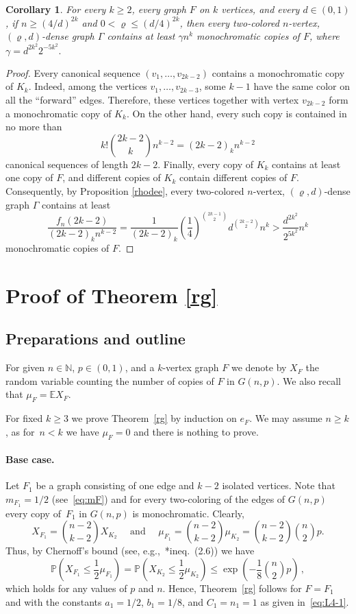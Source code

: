 \documentclass[reqno, 12pt]{amsart}
\newcommand{\PP}{\mathds{P}}
\newtheorem{cor}[theorem]{Corollary}
\let\rho=\varrho
\def\NN{\mathds N}
\def\PP{\mathds P}
\def\EE{\mathds E}
\begin{document}
\begin{cor}\label{mon}
 For every $k\ge2$, every graph $F$ on $k$ vertices, and every $d\in(0,1)$, if $n\ge (4/d)^{2k}$
 and $0<\rho\le(d/4)^{2k}$, then  every two-colored
 $n$-vertex, $(\rho,d)$-dense graph $\Gamma$ contains at least
    $\gamma n^k$
 monochromatic  copies of $F$, where $\gamma=d^{2k^2}2^{-5k^2}.$
\end{cor}

\begin{proof} Every canonical sequence $(v_1,\dots, v_{2k-2})$  contains a monochromatic  copy of $K_k$.
Indeed, among the vertices $v_1,\dots, v_{2k-3}$, some  $k-1$ have the same color on all the
``forward'' edges. Therefore, these vertices together with vertex $v_{2k-2}$ form a monochromatic
copy of $K_k$. On the other hand, every such copy is contained in no more than
\[
	k!\binom{2k-2}kn^{k-2}=(2k-2)_kn^{k-2}
\] 
canonical sequences of length $2k-2$. Finally, every copy
of $K_k$ contains at least one copy of $F$, and different copies of $K_k$ contain different copies
of $F$. Consequently, by Proposition \ref{rhodee}, every two-colored
 $n$-vertex, $(\rho,d)$-dense graph $\Gamma$ contains at least
 \[
    \frac{f_n(2k-2)}{(2k-2)_kn^{k-2}}=\frac1{(2k-2)_k}\left(\frac14\right)^{\binom{2k-1}2}d^{\binom{2k-2}2} n^k
    >
    \frac{d^{2k^2}}{2^{5k^2}}n^k
 \]
 monochromatic  copies of $F$. 
 \end{proof}

\section{Proof of Theorem \ref{rg}}\label{proofofmain}

\subsection{Preparations and outline}\label{prepout}
For given $n\in\NN$, $p\in(0,1)$, and a $k$-vertex graph $F$ we denote by $X_F$ the random variable counting the number of copies of $F$ in $G(n,p)$.
We also recall that $\mu_F=\EE X_F$.

For fixed $k\geq 3$ we prove Theorem~\ref{rg} by induction on $e_F$.
We may assume $n\ge k$, as for~$n<k$ we have $\mu_F=0$ and there is nothing to prove.

\paragraph*{Base case.}
Let $F_1$ be a graph consisting of one edge and $k-2$ isolated vertices. Note 
that~$m_{F_1}=1/2$
(see~\eqref{eq:mF}) and for every two-coloring of the edges of $G(n,p)$ every copy of~$F_1$ in
$G(n,p)$ is monochromatic. Clearly,
$$X_{F_1}=\binom{n-2}{k-2}X_{K_2}\quad\mbox{ and }\quad\mu_{F_1}=\binom{n-2}{k-2}\mu_{K_2}= \binom{n-2}{k-2}\binom n2 p.$$
 Thus,  by Chernoff's bound (see, e.g.,~\cite{JLR}*{ineq.~(2.6)}) we have
$$
    \PP\left(X_{F_1}\le \frac12\mu_{F_1}\right)=\PP\left(X_{K_2}\le \frac12\mu_{K_2}\right)
    \le \exp\left(-\frac18\binom n2p\right)\,,
$$
which holds for any values of $p$ and $n$.
Hence, Theorem~\ref{rg} follows for $F=F_1$ and
with the  constants $a_{1}=1/2$, $b_{1}=1/8$, and $C_{1}=n_{1}=1$
as given in~\eqref{eq:L4-1}.
\end{document}
